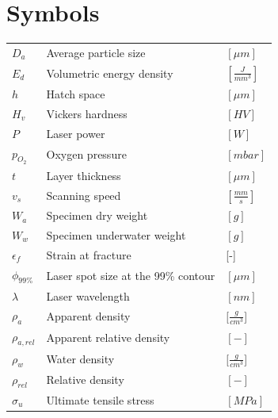 \documentclass[
11pt, %
british, %
singlespacing, %
headsepline, %
]{MastersDoctoralThesis} %
\begin{document}
%
%
%
%


\chapter*{Symbols}%
\begin{tabular}{lll}

\centering

$D_a$ & Average particle size & $[\mu m]$\\ 
$E_d$ & Volumetric energy density & $[\frac{J}{mm^3}]$\\
$h$ & Hatch space & $[\mu m]$\\
$H_v$ & Vickers hardness & $[HV]$\\
$P$ & Laser power & $[W]$ \\
$p_{O_2}$ & Oxygen pressure & $[mbar]$\\
$t$ & Layer thickness & $[\mu m]$\\
$v_s$ & Scanning speed & $[\frac{mm}{s}]$ \\
$W_a$ & Specimen dry weight& $ [g]$ \\
$W_w$ & Specimen underwater weight & $[g]$\\
\addlinespace
\addlinespace
$\epsilon_f$ & Strain at fracture & [-]\\
$\phi_{99\%}$ & Laser spot size at the 99\% contour & $[\mu m]$\\
$\lambda$ & Laser wavelength & $[nm]$\\
$\rho_{a}$ & Apparent density & $[\frac{g}{cm^3}$] \\
$\rho_{a,rel}$ & Apparent relative density & $[-]$ \\
$\rho_{w}$ & Water density & $[\frac{g}{cm^3}$]\\
$\rho_{rel}$ & Relative density & $[-]$ \\
$\sigma_u$ & Ultimate tensile stress & $[MPa]$\\


\end{tabular}
\end{document}
